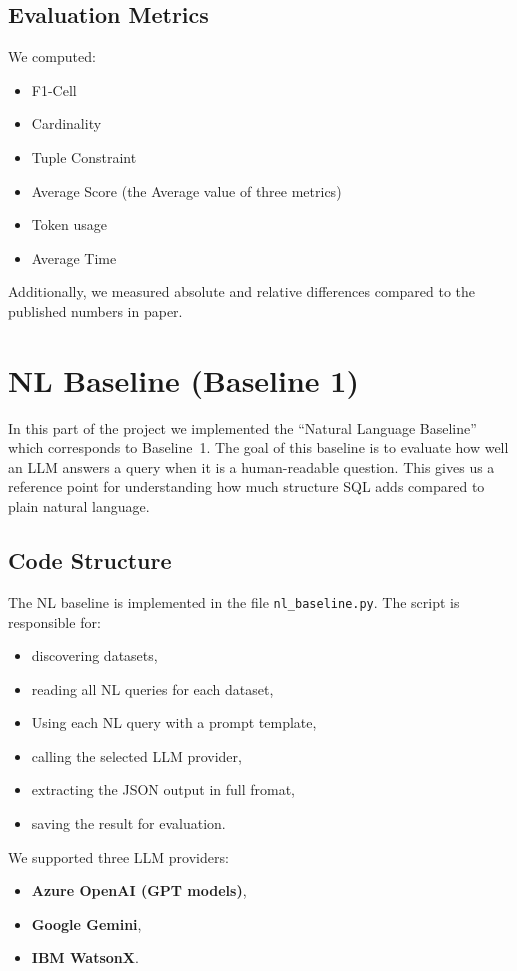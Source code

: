 \documentclass[12pt]{article}
\begin{document}
\subsection{Evaluation Metrics}
We computed:
\begin{itemize}
    \item F1-Cell
    \item Cardinality
    \item Tuple Constraint
    \item Average Score (the Average value of three metrics)
    \item Token usage
    \item Average Time
\end{itemize}

Additionally, we measured absolute and relative differences compared to the published numbers in paper.

\section{NL Baseline (Baseline 1)}

In this part of the project we implemented the ``Natural Language Baseline'' which corresponds to Baseline~1. The goal of this baseline is to evaluate how well an LLM answers a query when it is a human-readable question. This gives us a reference point for understanding how much structure SQL adds compared to plain natural language.

\subsection{Code Structure}

The NL baseline is implemented in the file \texttt{nl\_baseline.py}.  
The script is responsible for:
\begin{itemize}
    \item discovering datasets,
    \item reading all NL queries for each dataset,
    \item Using each NL query with a prompt template,
    \item calling the selected LLM provider,
    \item extracting the JSON output in full fromat, 
    \item saving the result for evaluation.
\end{itemize}

We supported three LLM providers:
\begin{itemize}
    \item \textbf{Azure OpenAI (GPT models)},
    \item \textbf{Google Gemini},
    \item \textbf{IBM WatsonX}.
\end{itemize}
\end{document}
